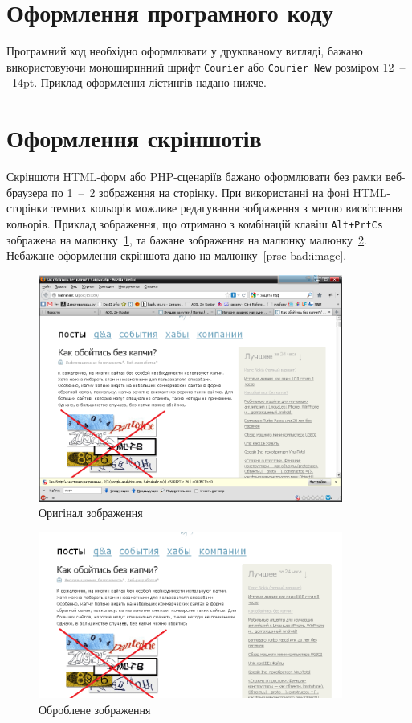 \section{Оформлення програмного коду}
Програмний код необхідно оформлювати у друкованому вигляді, бажано використовуючи моноширинний шрифт \verb'Сourier' або \verb'Сourier New' розміром 12~--~14pt. Приклад оформлення лістингів надано нижче.
\section{Оформлення скріншотів}
Скріншоти HTML-форм або PHP-сценаріїв бажано оформлювати без рамки веб-браузера по 1~--~2 зображення на сторінку. При використанні на фоні HTML-сторінки темних кольорів можливе редагування зображення з метою висвітлення кольорів. Приклад зображення, що отримано з комбінацій клавіш \verb'Alt+PrtCs' зображена на малюнку~\ref{prsc-orig:image}, та бажане зображення на малюнку малюнку~\ref{prsc-rel:image}. Небажане оформлення скріншота дано на  малюнку~\ref{prsc-bad:image}.

\begin{figure}
\includegraphics[scale=1,width=10cm]{ap01-09.png}
\caption{Оригінал зображення}
\label{prsc-orig:image}
\end{figure}


\begin{figure}
\includegraphics[scale=1,width=10cm]{ap01-10.png}
\caption{Оброблене зображення}
\label{prsc-rel:image}
\end{figure}

